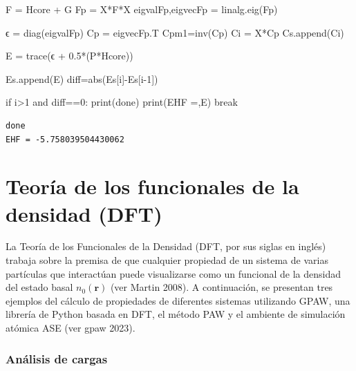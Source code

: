 \documentclass[
  letterpaper,
  DIV=11,
  numbers=noendperiod]{scrreprt}
\newenvironment{Shaded}{\begin{snugshade}}{\end{snugshade}}
\newcommand{\BuiltInTok}[1]{\textcolor[rgb]{0.00,0.23,0.31}{#1}}
\newcommand{\ControlFlowTok}[1]{\textcolor[rgb]{0.00,0.23,0.31}{#1}}
\newcommand{\DecValTok}[1]{\textcolor[rgb]{0.68,0.00,0.00}{#1}}
\newcommand{\FloatTok}[1]{\textcolor[rgb]{0.68,0.00,0.00}{#1}}
\newcommand{\KeywordTok}[1]{\textcolor[rgb]{0.00,0.23,0.31}{#1}}
\newcommand{\NormalTok}[1]{\textcolor[rgb]{0.00,0.23,0.31}{#1}}
\newcommand{\OperatorTok}[1]{\textcolor[rgb]{0.37,0.37,0.37}{#1}}
\newcommand{\StringTok}[1]{\textcolor[rgb]{0.13,0.47,0.30}{#1}}
\begin{document}
\begin{Shaded}
\begin{Highlighting}[]
\NormalTok{    F }\OperatorTok{=}\NormalTok{ Hcore }\OperatorTok{+}\NormalTok{ G}
\NormalTok{    Fp }\OperatorTok{=}\NormalTok{ X}\OperatorTok{*}\NormalTok{F}\OperatorTok{*}\NormalTok{X}
\NormalTok{    eigvalFp,eigvecFp }\OperatorTok{=}\NormalTok{ linalg.eig(Fp)}
    
\NormalTok{    ϵ }\OperatorTok{=}\NormalTok{ diag(eigvalFp)}
\NormalTok{    Cp }\OperatorTok{=}\NormalTok{ eigvecFp.T}
\NormalTok{    Cpm1}\OperatorTok{=}\NormalTok{inv(Cp)}
\NormalTok{    Ci }\OperatorTok{=}\NormalTok{ X}\OperatorTok{*}\NormalTok{Cp}
\NormalTok{    Cs.append(Ci)}

\NormalTok{    E }\OperatorTok{=}\NormalTok{ trace(ϵ }\OperatorTok{+} \FloatTok{0.5}\OperatorTok{*}\NormalTok{(P}\OperatorTok{*}\NormalTok{Hcore))}

\NormalTok{    Es.append(E)}
\NormalTok{    diff}\OperatorTok{=}\BuiltInTok{abs}\NormalTok{(Es[i]}\OperatorTok{{-}}\NormalTok{Es[i}\OperatorTok{{-}}\DecValTok{1}\NormalTok{])}
    
    \ControlFlowTok{if}\NormalTok{ i}\OperatorTok{\textgreater{}}\DecValTok{1} \KeywordTok{and}\NormalTok{ diff}\OperatorTok{==}\DecValTok{0}\NormalTok{:}
        \BuiltInTok{print}\NormalTok{(}\StringTok{\textquotesingle{}done\textquotesingle{}}\NormalTok{)}
        \BuiltInTok{print}\NormalTok{(}\StringTok{\textquotesingle{}EHF =\textquotesingle{}}\NormalTok{,E)}
        \ControlFlowTok{break}
\end{Highlighting}
\end{Shaded}

\begin{verbatim}
done
EHF = -5.758039504430062
\end{verbatim}

\part{Teoría de los funcionales de la densidad (DFT)}

La Teoría de los Funcionales de la Densidad (DFT, por sus siglas en
inglés) trabaja sobre la premisa de que cualquier propiedad de un
sistema de varias partículas que interactúan puede visualizarse como un
funcional de la densidad del estado basal \(n_0(\textbf{r})\) (ver
Martin 2008). A continuación, se presentan tres ejemplos del cálculo de
propiedades de diferentes sistemas utilizando GPAW, una librería de
Python basada en DFT, el método PAW y el ambiente de simulación atómica
ASE (ver gpaw 2023).

\hypertarget{anuxe1lisis-de-cargas}{%
\section*{Análisis de cargas}\label{anuxe1lisis-de-cargas}}
\end{document}
